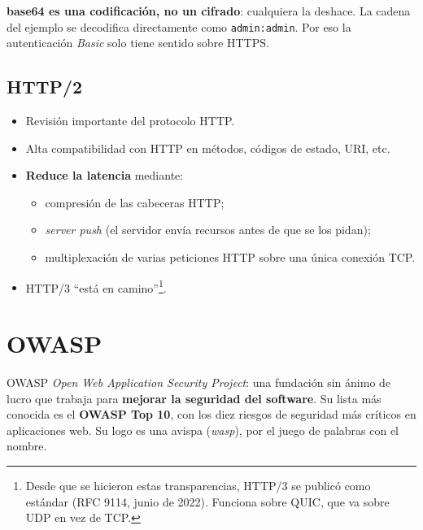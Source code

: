 \documentclass[11pt,a4paper]{report}
\begin{document}
\begin{importante}
\textbf{base64 es una codificación, no un cifrado}: cualquiera la deshace. La cadena del ejemplo se decodifica directamente como \texttt{admin:admin}. Por eso la autenticación \emph{Basic} solo tiene sentido sobre HTTPS.
\end{importante}
 
\subsection{HTTP/2}
 
\begin{itemize}
  \item Revisión importante del protocolo HTTP.
  \item Alta compatibilidad con HTTP en métodos, códigos de estado, URI, etc.
  \item \textbf{Reduce la latencia} mediante:
    \begin{itemize}
      \item compresión de las cabeceras HTTP;
      \item \emph{server push} (el servidor envía recursos antes de que se los pidan);
      \item multiplexación de varias peticiones HTTP sobre una única conexión TCP.
    \end{itemize}
  \item HTTP/3 ``está en camino''\footnote{Desde que se hicieron estas transparencias, HTTP/3 se publicó como estándar (RFC 9114, junio de 2022). Funciona sobre QUIC, que va sobre UDP en vez de TCP.}.
\end{itemize}
 
\section{OWASP}
 
\begin{definicion}{OWASP}
\emph{Open Web Application Security Project}: una fundación sin ánimo de lucro que trabaja para \textbf{mejorar la seguridad del software}. Su lista más conocida es el \textbf{OWASP Top 10}, con los diez riesgos de seguridad más críticos en aplicaciones web. Su logo es una avispa (\emph{wasp}), por el juego de palabras con el nombre.
\end{definicion}
 
\end{document}
